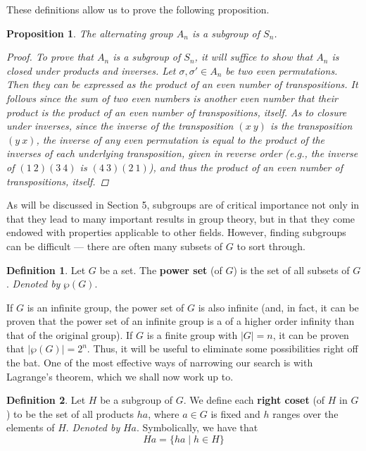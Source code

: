 \documentclass[openany, amssymb, psamsfonts]{amsart}
\newtheorem{prop}{Proposition}[section]
\theoremstyle{definition}
\newtheorem{defn}{Definition}[section]
\numberwithin{equation}{section}
\begin{document}
These definitions allow us to prove the following proposition.
\begin{prop}
    The alternating group $A_n$ is a subgroup of $S_n$.
    \begin{proof}
        To prove that $A_n$ is a subgroup of $S_n$, it will suffice to show that $A_n$ is closed under products and inverses. Let $\sigma,\sigma'\in A_n$ be two even permutations. Then they can be expressed as the product of an even number of transpositions. It follows since the sum of two even numbers is another even number that their product is the product of an even number of transpositions, itself. As to closure under inverses, since the inverse of the transposition $(x\ y)$ is the transposition $(y\ x)$, the inverse of any even permutation is equal to the product of the inverses of each underlying transposition, given in reverse order (e.g., the inverse of $(1\ 2)(3\ 4)$ is $(4\ 3)(2\ 1)$), and thus the product of an even number of transpositions, itself.
    \end{proof}
\end{prop}
As will be discussed in Section 5, subgroups are of critical importance not only in that they lead to many important results in group theory, but in that they come endowed with properties applicable to other fields. However, finding subgroups can be difficult --- there are often many subsets of $G$ to sort through.
\begin{defn}
    Let $G$ be a set. The \textbf{power set} (of $G$) is the set of all subsets of $G$. \emph{Denoted by} $\wp(G)$.
\end{defn}
If $G$ is an infinite group, the power set of $G$ is also infinite (and, in fact, it can be proven that the power set of an infinite group is a of a higher order infinity than that of the original group). If $G$ is a finite group with $|G|=n$, it can be proven that $|\wp(G)|=2^n$. Thus, it will be useful to eliminate some possibilities right off the bat. One of the most effective ways of narrowing our search is with Lagrange's theorem, which we shall now work up to.\par
\begin{defn}
    Let $H$ be a subgroup of $G$. We define each \textbf{right coset} (of $H$ in $G$) to be the set of all products $ha$, where $a\in G$ is fixed and $h$ ranges over the elements of $H$. \emph{Denoted by} $Ha$. Symbolically, we have that
    \begin{equation*}
        Ha = \{ha\mid h\in H\}
    \end{equation*}
\end{defn}
\end{document}
